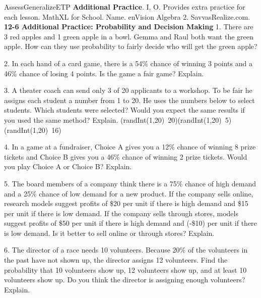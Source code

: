\documentclass{article}
\newenvironment{te-addendum}[2]{}{}     %
\newcommand{\answer}[1]{}               %
\newcommand{\te}[1]{}                   %
\begin{document}
\begin{te-addendum}{Assess}{GeneralizeETP}
\textbf{Additional Practice}. I, O.
Provides extra practice for each lesson.
MathXL for School. Name. enVision Algebra 2. SavvasRealize.com.
\textbf{12-6 Additional Practice: Probability and Decision Making}
1. There are 3 red apples and 1 green apple in a bowl. Gemma and Raul both want the green apple. How can they use probability to fairly decide who will get the green apple?
\answer{Answers may vary. Sample answer: Assign three different numbers to each person on a number cube. Then roll the number cube. Each person has a 50\% chance of success.}
2. In each hand of a card game, there is a 54\% chance of winning 3 points and a 46\% chance of losing 4 points. Is the game a fair game? Explain.
\answer{No, the expected value on each hand is (-0.22) and not equal to zero, so the game is not fair.}
3. A theater coach can send only 3 of 20 applicants to a workshop. To be fair he assigns each student a number from 1 to 20. He uses the numbers below to select students. Which students were selected? Would you expect the same results if you used the same method? Explain.
(randInt(1,20)\ 20)\quad(randInt(1,20)\ 5)\quad(randInt(1,20)\ 16)
\answer{The 20th, 5th, and 16th students were selected. If I used this method, I would expect different results since the numbers are randomly generated.}
4. In a game at a fundraiser, Choice A gives you a 12\% chance of winning 8 prize tickets and Choice B gives you a 46\% chance of winning 2 prize tickets. Would you play Choice A or Choice B? Explain.
\answer{Sample answer: I would play Choice A because it has an expected value 0.96 which is greater than the expected value of Choice B.}
5. The board members of a company think there is a 75\% chance of high demand and a 25\% chance of low demand for a new product. If the company sells online, research models suggest profits of \$20 per unit if there is high demand and \$15 per unit if there is low demand. If the company sells through stores, models suggest profits of \$50 per unit if there is high demand and (-\$10) per unit if there is low demand. Is it better to sell online or through stores? Explain.
\answer{Through stores, because expected profit is higher. Expected profit online: \$18.75; Expected profit in stores: \$35}
6. The director of a race needs 10 volunteers. Because 20\% of the volunteers in the past have not shown up, the director assigns 12 volunteers. Find the probability that 10 volunteers show up, 12 volunteers show up, and at least 10 volunteers show up. Do you think the director is assigning enough volunteers? Explain.
\answer{0.283; 0.069; 0.558; Sample answer: No, the probability of at least 10 volunteers showing up is less than 56\%. So more than 44\% of the time, not enough volunteers will come.}
\te{enVision Algebra 2 • Teaching Resources. Copyright © Savvas Learning Company LLC. All Rights Reserved.}
\end{te-addendum}
\end{document}
